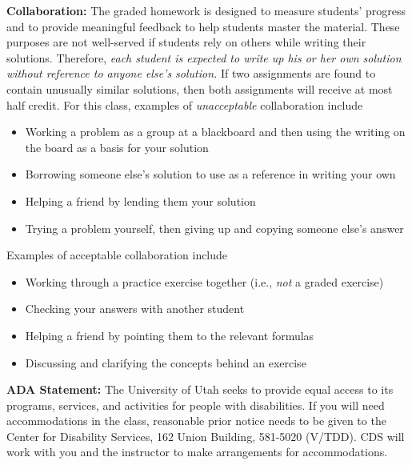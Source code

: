 \documentclass[12pt]{article}
\begin{document}
{\bf Collaboration:} 
The graded homework is designed to measure students' progress and to provide meaningful feedback to help students master the material. These purposes are not well-served if students rely on others while writing their solutions. Therefore, \emph{each student is expected to write up his or her own solution without reference to anyone else's solution.} If two assignments are found to contain unusually similar solutions, then both assignments will receive at most half credit. 
For this class, examples of \emph{unacceptable} collaboration include
\begin{itemize}
\item Working a problem as a group at a blackboard and then using the writing on the board as a basis for your solution
\item Borrowing someone else's solution to use as a reference in writing your own
\item Helping a friend by lending them your solution
\item Trying a problem yourself, then giving up and copying someone else's answer
\end{itemize}
Examples of acceptable collaboration include
\begin{itemize}
\item Working through a practice exercise together (i.e., \emph{not} a graded exercise)
\item Checking your answers with another student
\item Helping a friend by pointing them to the relevant formulas
\item Discussing and clarifying the concepts behind an exercise
\end{itemize}


{\bf ADA Statement:} The University of Utah seeks to provide equal access to its programs, services, and activities for people with disabilities. If you will need accommodations in the class, reasonable prior notice needs to be given to the Center for Disability Services, 162 Union Building, 581-5020 (V/TDD). CDS will work with you and the instructor to make arrangements for accommodations.
\end{document}
